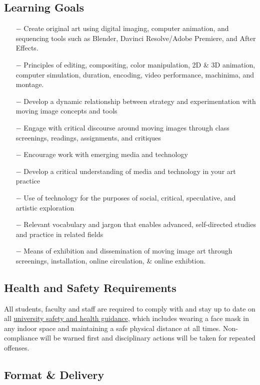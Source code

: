 \documentclass[12pt,letter,english]{report}
\providecommand{\tightlist}{%
      \setlength{\itemsep}{0pt}\setlength{\parskip}{0pt}%
}
\begin{document}
\subsection{Learning Goals}

\begin{itemize}
      \tightlist
      \item[$-$] Create original art using digital imaging, computer animation, and sequencing tools such as Blender, Davinci Resolve/Adobe Premiere, and After Effects.
      \item[$-$] Principles of editing, compositing, color manipulation, 2D \& 3D animation, computer simulation, duration, encoding, video performance, machinima, and montage.
      \item[$-$] Develop a dynamic relationship between strategy and experimentation with moving image concepts and tools
      \item[$-$] Engage with critical discourse around moving images through class screenings, readings, assignments, and critiques
      \item[$-$] Encourage work with emerging media and technology
      \item[$-$] Develop a critical understanding of media and technology in your art practice
      \item[$-$] Use of technology for the purposes of social, critical, speculative, and artistic exploration
      \item[$-$] Relevant vocabulary and jargon that enables advanced, self-directed studies and practice in related fields 
      \item[$-$] Means of exhibition and dissemination of moving image art through screenings, installation, online circulation, \& online exhibtion.
\end{itemize}

\subsection{Health and Safety Requirements}

All students, faculty and staff are required to comply with and stay up to date on all \href{https://safeandhealthy.osu.edu}{university safety and health guidance}, which includes wearing a face mask in any indoor space and maintaining a safe physical distance at all times. Non-compliance will be warned first and disciplinary actions will be taken for repeated offenses.

\subsection{Format \& Delivery}
\end{document}
